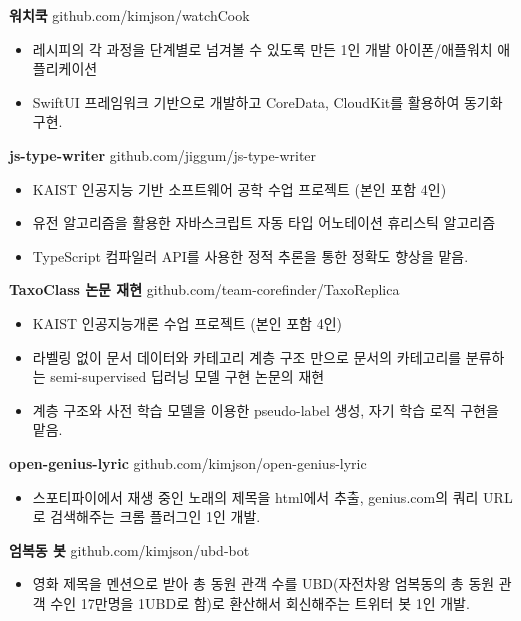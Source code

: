 \documentclass{article}
\begin{document}
\textbf{워치쿡} \hfill github.com/kimjson/watchCook
\begin{itemize}
    \setlength\itemsep{0.1em}
    \item 레시피의 각 과정을 단계별로 넘겨볼 수 있도록 만든 1인 개발 아이폰/애플워치 애플리케이션
    \item SwiftUI 프레임워크 기반으로 개발하고 CoreData, CloudKit를 활용하여 동기화 구현.
\end{itemize}

\textbf{js-type-writer} \hfill github.com/jiggum/js-type-writer
\begin{itemize}
    \setlength\itemsep{0.1em}
    \item KAIST 인공지능 기반 소프트웨어 공학 수업 프로젝트 (본인 포함 4인)
    \item 유전 알고리즘을 활용한 자바스크립트 자동 타입 어노테이션 휴리스틱 알고리즘
    \item TypeScript 컴파일러 API를 사용한 정적 추론을 통한 정확도 향상을 맡음.
\end{itemize}

\textbf{TaxoClass 논문 재현} \hfill github.com/team-corefinder/TaxoReplica
\begin{itemize}
    \setlength\itemsep{0.1em}
    \item KAIST 인공지능개론 수업 프로젝트 (본인 포함 4인)
    \item 라벨링 없이 문서 데이터와 카테고리 계층 구조 만으로 문서의 카테고리를 분류하는 semi-supervised 딥러닝 모델 구현 논문의 재현
    \item 계층 구조와 사전 학습 모델을 이용한 pseudo-label 생성, 자기 학습 로직 구현을 맡음.
\end{itemize}

\textbf{open-genius-lyric} \hfill github.com/kimjson/open-genius-lyric
\begin{itemize}
    \setlength\itemsep{0.1em}
    \item 스포티파이에서 재생 중인 노래의 제목을 html에서 추출, genius.com의 쿼리 URL로 검색해주는 크롬 플러그인 1인 개발.
\end{itemize}

\textbf{엄복동 봇} \hfill github.com/kimjson/ubd-bot
\begin{itemize}
    \setlength\itemsep{0.1em}
    \item 영화 제목을 멘션으로 받아 총 동원 관객 수를 UBD(자전차왕 엄복동의 총 동원 관객 수인 17만명을 1UBD로 함)로 환산해서 회신해주는 트위터 봇 1인 개발.
\end{itemize}
\end{document}
